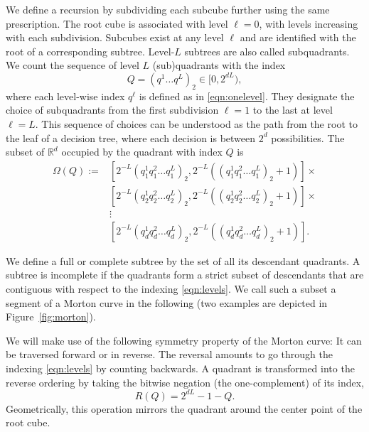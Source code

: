 \documentclass[a4paper,11pt]{article}
\newcommand{\eqnlab}[1]{\label{eqn:#1}}
\newcommand{\eqnref}[1]{\eqref{eqn:#1}}
\newcommand{\figref}[1]{Figure~\ref{fig:#1}}
\begin{document}
We define a recursion by subdividing each subcube further using the same
prescription.  The root cube is associated with level $\ell = 0$, with levels
increasing with each subdivision.  Subcubes exist at any level $\ell$ and are
identified with the root of a corresponding subtree.  Level-$L$ subtrees are
also called subquadrants.  We count the sequence of level $L$ (sub)quadrants
with the index
\begin{equation}
  \eqnlab{levels}
  Q = (q^1 \ldots q^L)_2 \in [0, 2^{dL})
  ,
\end{equation}
where each level-wise index $q^\ell$ is defined as in \eqnref{onelevel}.
They designate the choice of subquadrants from the first subdivision
$\ell = 1$ to the last at level $\ell = L$.  This sequence of choices can be
understood as the path from the root to the leaf of a decision tree, where each
decision is between $2^d$ possibilities.  The subset of $\mathbb{R}^d$
occupied by the quadrant with index $Q$ is
\begin{equation}\eqnlab{rdset}
  \begin{aligned}
    \Omega(Q) := &[2^{-L}(q^1_1 q^2_1 \dots q^L_1)_2,
     2^{-L}((q^1_1 q^2_1 \dots q^L_1)_2 + 1)] \times \\
    &[2^{-L}(q^1_2 q^2_2 \dots q^L_2)_2,
     2^{-L}((q^1_2 q^2_2 \dots q^L_2)_2 + 1)] \times \\
    &\vdots \\
    &[2^{-L}(q^1_d q^2_d \dots q^L_d)_2,
     2^{-L}((q^1_d q^2_d \dots q^L_d)_2 + 1)].
   \end{aligned}
\end{equation}

We define a full or complete subtree by the set of all its descendant
quadrants.  A subtree is incomplete if the quadrants form a strict subset of
descendants that are contiguous with respect to the indexing \eqnref{levels}.
We call such a subset a segment of a Morton curve in the following (two
examples are depicted in \figref{morton}).

We will make use of the following symmetry property of the Morton curve: It can
be traversed forward or in reverse.  The reversal amounts to go through the
indexing \eqnref{levels} by counting backwards.  A quadrant is transformed into
the reverse ordering by taking the bitwise negation (the one-complement) of its
index,
\begin{equation}
  \eqnlab{Rdef}
  R(Q) = 2^{dL} - 1 - Q.
\end{equation}
Geometrically, this operation mirrors the quadrant around the center point of
the root cube.
\end{document}
